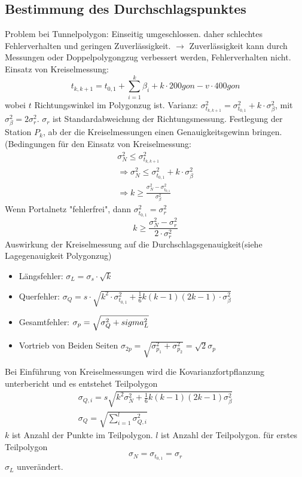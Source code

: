 \documentclass[12pt]{article}
\begin{document}
\subsection{Bestimmung des Durchschlagspunktes}
Problem bei Tunnelpolygon: Einseitig umgeschlossen. daher schlechtes Fehlerverhalten und geringen Zuverlässigkeit. $\longrightarrow$ Zuverlässigkeit kann durch Messungen oder Doppelpolygongzug verbessert werden, Fehlerverhalten nicht. \newline
Einsatz von Kreiselmessung:
\begin{equation*}
	t_{k,k+1} = t_{0,1} + \sum_{i=1}^{k} \beta_i + k \cdot 200gon - v \cdot 400gon
\end{equation*}
wobei $t$ Richtungswinkel im Polygonzug ist.\newline
Varianz: $\sigma_{t_{k,k+1}}^2 = \sigma_{t_{0,1}}^2 + k\cdot \sigma_{\beta}^2$, mit $\sigma_{\beta}^2 = 2\sigma_{r}^2$. $\sigma_r$ ist Standardabweichung der Richtungsmessung. \newline
Festlegung der Station $P_k$, ab der die Kreiselmessungen einen Genauigkeitsgewinn bringen.(Bedingungen für den Einsatz von Kreiselmessung:
\begin{gather*}
	\sigma_N^2 \leq \sigma_{t_{k,k+1}}^2 \\
	\Longrightarrow \sigma_N^2 \leq \sigma_{t_{0,1}}^2 + k \cdot \sigma_{\beta}^2 \\
	\Longrightarrow k \geq \frac{\sigma_N^2 - \sigma_{t_{0,1}}^2}{\sigma_{\beta}^2}
\end{gather*}
Wenn Portalnetz "fehlerfrei", dann $\sigma_{t_{0,1}}^2 = \sigma_r^2$
\begin{equation*}
	k \geq \frac{\sigma_N^2 - \sigma_r^2}{2 \cdot \sigma_r^2}
\end{equation*}
Auswirkung der Kreiselmessung auf die Durchschlagsgenauigkeit(siehe Lagegenauigkeit Polygonzug)
\begin{itemize}
	\item Längsfehler: $\sigma_L = \sigma_s \cdot \sqrt{k}$
	\item Querfehler: $\sigma_Q = s \cdot \sqrt{k^2 \cdot \sigma_{t_{0,1}}^2 + \frac{1}{6}k(k-1)(2k-1) \cdot \sigma_{\beta}^2}$
	\item Gesamtfehler: $\sigma_p = \sqrt{\sigma_Q^2 + \\sigma_L^2}$
	\item Vortrieb von Beiden Seiten $\sigma_{2p} = \sqrt{\sigma_{p_1}^2 + \sigma_{p_2}^2} = \sqrt{2}\sigma_p$
\end{itemize}
Bei Einführung von Kreiselmessungen wird die Kovarianzfortpflanzung unterbericht und es entstehet Teilpolygon
\begin{gather*}
	\sigma_{Q,i} = s \sqrt{k^2 \sigma_N^2 + \frac{1}{6} k(k-1)(2k-1) \sigma_{\beta}^2} \\
	\sigma_Q = \sqrt{\sum_{i=1}^{l} \sigma_{Q,i}^2}
\end{gather*}
$k$ ist Anzahl der Punkte im Teilpolygon. $l$ ist Anzahl der Teilpolygon.\newline
 für erstes Teilpolygon
 \begin{equation*}
 	\sigma_N = \sigma_{t_{0,1}} = \sigma_r
 \end{equation*}
 $\sigma_L$ unverändert.
\end{document}
